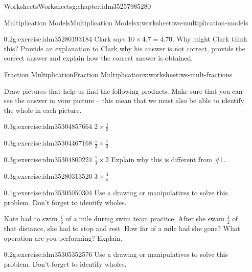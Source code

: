 \documentclass[twoside,11pt,]{book}
\begin{document}
\begin{chapterptx}{Worksheets}{}{Worksheets}{}{}{g:chapter:idm35257985280}
\begin{worksheet-section-numberless}{Multiplication Models}{}{Multiplication Models}{}{}{x:worksheet:ws-multiplication-models}
\begin{divisionexercise}{18}{}{0.2}{g:exercise:idm35280193184}
Clark says \(10 \times 4.7=4.70 \). Why might Clark think this? Provide an explanation to Clark why his answer is not correct, provide the correct answer and explain how the correct answer is obtained.%
\end{divisionexercise}%
\end{worksheet-section-numberless}
\restoregeometry
%
%
\typeout{************************************************}
\typeout{************************************************}
%
\begin{worksheet-section-numberless}{Fraction Multiplication}{}{Fraction Multiplication}{}{}{x:worksheet:ws-mult-fractions}
\begin{introduction}{}%
Draw pictures that help us find the following products.  Make sure that you can see the answer in your picture – this mean that we must also be able to identify the whole in each picture.%
\end{introduction}%
\begin{divisionexercise}{1}{}{0.3}{g:exercise:idm35304857664}%
\(2 \times \frac{1}{3} \)%
\end{divisionexercise}%
\begin{divisionexercise}{2}{}{0.3}{g:exercise:idm35304467168}%
\(\frac{1}{2} \times \frac{1}{3} \)%
\end{divisionexercise}%
\clearpage
\begin{divisionexercise}{3}{}{0.3}{g:exercise:idm35304800224}%
\(\frac{1}{3} \times 2  \)  Explain why this is different from \#1.%
\end{divisionexercise}%
\begin{divisionexercise}{4}{}{0.3}{g:exercise:idm35280313520}%
\(3 \times \frac{4}{5} \)%
\end{divisionexercise}%
\begin{divisionexercise}{5}{}{0.1}{g:exercise:idm35305050304}%
Use a drawing or manipulatives to solve this problem. Don’t forget to identify wholes.%
\par
Kate had to swim \(\frac{1}{6} \) of a mile during swim team practice.  After she swam \(\frac{1}{2} \) of that distance, she had to stop and rest. How far of a mile had she gone? What operation are you performing? Explain.%
\end{divisionexercise}%
\clearpage
\begin{divisionexercise}{6}{}{0.2}{g:exercise:idm35305352576}%
Use a drawing or manipulatives to solve this problem. Don’t forget to identify wholes.%

\end{divisionexercise}
\end{worksheet-section-numberless}
\end{chapterptx}
\end{document}
